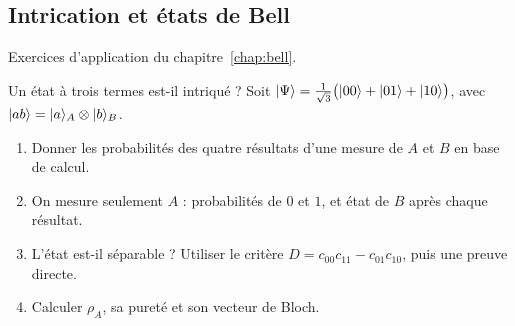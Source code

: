 \subsection{Intrication et états de Bell}\label{sec:ex-bell}

Exercices d'application du chapitre~\ref{chap:bell}.

\begin{exercice}{Un état à trois termes est-il intriqué ?}\label{ex:separable3}
Soit $|\Psi\rangle=\frac{1}{\sqrt3}\big(|00\rangle+|01\rangle+|10\rangle\big)$, avec
$|ab\rangle=|a\rangle_A\otimes|b\rangle_B$.
\begin{enumerate}[label=\arabic*.,nosep]
  \item Donner les probabilités des quatre résultats d'une mesure de $A$ et $B$ en base de calcul.
  \item On mesure seulement $A$ : probabilités de $0$ et $1$, et état de $B$ après chaque résultat.
  \item L'état est-il séparable ? Utiliser le critère $D=c_{00}c_{11}-c_{01}c_{10}$, puis une preuve directe.
  \item Calculer $\rho_A$, sa pureté et son vecteur de Bloch.
\end{enumerate}
\end{exercice}
